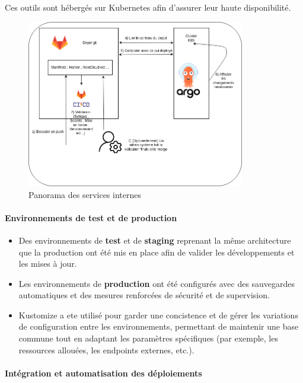 {Ces outils sont hébergés sur Kubernetes afin d’assurer leur haute disponibilité.

\begin{figure}[H]
	\centering
	\includegraphics[width=0.85\textwidth]{figures/services-internes.png}
	\caption{Panorama des services internes}
\end{figure}

\paragraph{\textbf{Environnements de test et de production}}

\begin{itemize}
	\item Des environnements de \textbf{test} et de \textbf{staging} reprenant la même architecture que la production ont été mis en place afin de valider les développements et les mises à jour.
	\item Les environnements de \textbf{production} ont été configurés avec des sauvegardes automatiques et des mesures renforcées de sécurité et de supervision.
	\item Kustomize a ete utilisé pour garder une concistence et de gérer les variations de configuration entre les environnements, permettant de maintenir une base commune tout en adaptant les paramètres spécifiques (par exemple, les ressources allouées, les endpoints externes, etc.).
\end{itemize}

\paragraph{\textbf{Intégration et automatisation des déploiements}}

}
